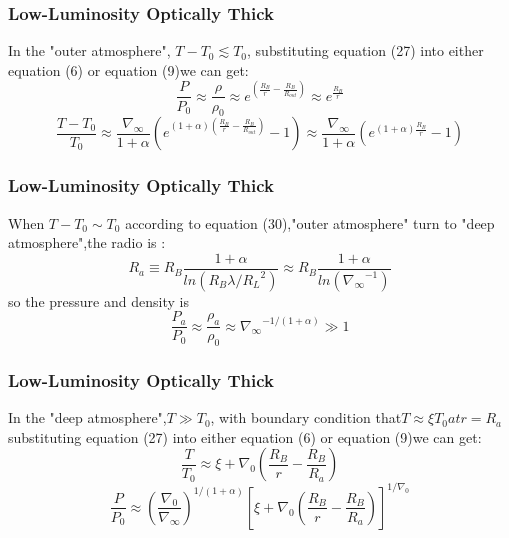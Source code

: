 \documentclass{beamer}
\begin{document}
\begin{frame}
\frametitle{Low-Luminosity Optically Thick}
In the "outer atmosphere", $ T-T_0\lesssim T_0$, substituting equation (27) into either equation (6) or equation (9)we can get:
\begin{equation}
\frac{P}{P_0}\approx\frac{\rho}{\rho_0}\approx e^{(\frac{R_B}{r}-\frac{R_B}{R_{out}})}\approx e^{\frac{R_B}{r}}
\end{equation}
\begin{equation}
\frac{T-T_0}{T_0}\approx \frac{\nabla_{\infty}}{1+\alpha}(e^{(1+\alpha)(\frac{R_B}{r}-\frac{R_B}{R_{out}})}-1)\approx \frac{\nabla_{\infty}}{1+\alpha}(e^{(1+\alpha)\frac{R_B}{r}}-1)
\end{equation}
\end{frame}

\begin{frame}
\frametitle{Low-Luminosity Optically Thick}
When $T-T_0 \sim T_0$ according to equation (30),"outer atmosphere" turn to "deep atmosphere",the radio is :
\begin{equation}
R_a\equiv R_B\frac{1+\alpha}{ln(R_B \lambda/{R_L}^2)}\approx R_B \frac{1+\alpha}{ln({\nabla_{\infty}}^{-1})}
\end{equation}
so the pressure and density is
\begin{equation}
\frac{P_a}{P_0}\approx\frac{\rho_a}{\rho_0}\approx {\nabla_{\infty}}^{-1/(1+\alpha)}\gg 1
\end{equation}
\end{frame}

\begin{frame}
\frametitle{Low-Luminosity Optically Thick}
In the "deep atmosphere",$ T \gg T_0$, with boundary condition that$T \approx \xi T_0 at r =R_a$ substituting equation (27) into either equation (6) or equation (9)we can get:
\begin{equation}
\frac{T}{T_0}\approx \xi +\nabla_0 (\frac{R_B}{r}-\frac{R_B}{R_a})
\end{equation}
\begin{equation}
\frac{P}{P_0}\approx (\frac{\nabla_0}{\nabla_{\infty}})^{1/(1+\alpha)}[\xi +\nabla_0 (\frac{R_B}{r}-\frac{R_B}{R_a})]^{1/\nabla_0}
\end{equation}
\end{frame}
\end{document}
